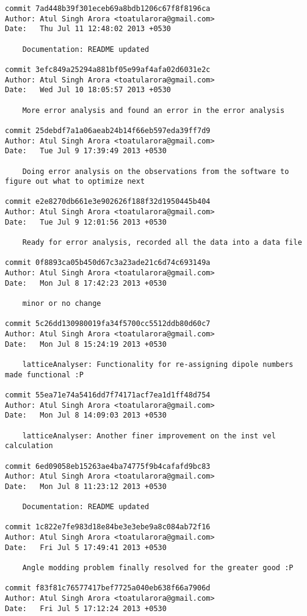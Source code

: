 \begin{lstlisting}
commit 7ad448b39f301eceb69a8bdb1206c67f8f8196ca
Author: Atul Singh Arora <toatularora@gmail.com>
Date:   Thu Jul 11 12:48:02 2013 +0530

    Documentation: README updated

commit 3efc849a25294a881bf05e99af4afa02d6031e2c
Author: Atul Singh Arora <toatularora@gmail.com>
Date:   Wed Jul 10 18:05:57 2013 +0530

    More error analysis and found an error in the error analysis

commit 25debdf7a1a06aeab24b14f66eb597eda39ff7d9
Author: Atul Singh Arora <toatularora@gmail.com>
Date:   Tue Jul 9 17:39:49 2013 +0530

    Doing error analysis on the observations from the software to figure out what to optimize next

commit e2e8270db661e3e902626f188f32d1950445b404
Author: Atul Singh Arora <toatularora@gmail.com>
Date:   Tue Jul 9 12:01:56 2013 +0530

    Ready for error analysis, recorded all the data into a data file

commit 0f8893ca05b450d67c3a23ade21c6d74c693149a
Author: Atul Singh Arora <toatularora@gmail.com>
Date:   Mon Jul 8 17:42:23 2013 +0530

    minor or no change

commit 5c26dd130980019fa34f5700cc5512ddb80d60c7
Author: Atul Singh Arora <toatularora@gmail.com>
Date:   Mon Jul 8 15:24:19 2013 +0530

    latticeAnalyser: Functionality for re-assigning dipole numbers made functional :P

commit 55ea71e74a5416dd7f74171acf7ea1d1ff48d754
Author: Atul Singh Arora <toatularora@gmail.com>
Date:   Mon Jul 8 14:09:03 2013 +0530

    latticeAnalyser: Another finer improvement on the inst vel calculation

commit 6ed09058eb15263ae4ba74775f9b4cafafd9bc83
Author: Atul Singh Arora <toatularora@gmail.com>
Date:   Mon Jul 8 11:23:12 2013 +0530

    Documentation: README updated

commit 1c822e7fe983d18e84be3e3ebe9a8c084ab72f16
Author: Atul Singh Arora <toatularora@gmail.com>
Date:   Fri Jul 5 17:49:41 2013 +0530

    Angle modding problem finally resolved for the greater good :P

commit f83f81c76577417bef7725a040eb638f66a7906d
Author: Atul Singh Arora <toatularora@gmail.com>
Date:   Fri Jul 5 17:12:24 2013 +0530


\end{lstlisting}

